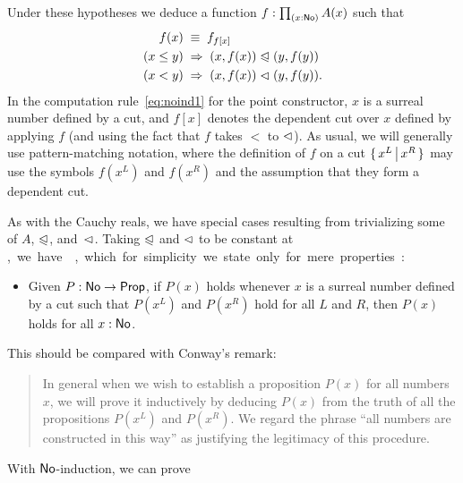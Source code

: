 Under these hypotheses we deduce a function $f:\prd{x:\NO} A(x)$ such that
\begin{align}
  f(x) &\;\jdeq\; f_{f[x]} \label{eq:noind1}\\
  (x\le y) &\;\Rightarrow\; (x,f(x)) \ble (y,f(y)) \notag\\
  (x< y) &\;\Rightarrow\; (x,f(x)) \blt (y,f(y)). \notag
\end{align}
In the computation rule~\eqref{eq:noind1} for the point constructor, $x$ is a surreal number defined by a cut, and $f[x]$ denotes the dependent cut over $x$ defined by applying $f$ (and using the fact that $f$ takes $<$ to $\vartriangleleft$).
As usual, we will generally use pattern-matching notation, where the definition of $f$ on a cut $\{\,x^L\,\big|\,x^R\,\}$ may use the symbols $f(x^L)$ and $f(x^R)$ and the assumption that they form a dependent cut.

As with the Cauchy reals, we have special cases resulting from trivializing some of $A$, $\trianglelefteqslant$, and~$\vartriangleleft$.
Taking $\trianglelefteqslant$ and $\vartriangleleft$ to be constant at \unit, we have , which for simplicity we state only for mere properties:
\begin{itemize}
\item Given $P:\mathsf{No}\to\mathsf{Prop}$, if $P(x)$ holds whenever $x$ is a surreal number defined by a cut such that $P(x^L)$ and $P(x^R)$ hold for all
$L$ and $R$, then $P(x)$ holds for all $x:\mathsf{No}$.
\end{itemize}
This should be compared with Conway's remark:
\begin{quote}\footnotesize
  In general when we wish to establish a proposition $P(x)$ for all numbers $x$, we will prove it inductively by deducing $P(x)$ from the truth of all the propositions $P(x^L)$ and $P(x^R)$.
  We regard the phrase ``all numbers are constructed in this way'' as justifying the legitimacy of this procedure.
\end{quote}
With $\mathsf{No}$-induction, we can prove


